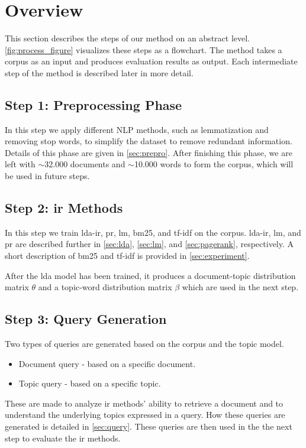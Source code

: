 \section{Overview}\label{sec:method}
This section describes the steps of our method on an abstract level.
\autoref{fig:process_figure} visualizes these steps as a flowchart.
The method takes a corpus as an input and produces evaluation results as output.
Each intermediate step of the method is described later in more detail.

\subsection*{Step 1: Preprocessing Phase}
In this step we apply different \gls{NLP} methods, such as lemmatization and removing stop words, to simplify the dataset to remove redundant information.
Details of this phase are given in \autoref{sec:prepro}.
After finishing this phase, we are left with $\sim$32.000 documents and $\sim$10.000 words to form the corpus, which will be used in future steps.

\subsection*{Step 2: \Gls{ir} Methods}
In this step we train \gls{lda}-\gls{ir}, \gls{pr}, \gls{lm}, \gls{bm25}, and \gls{tf-idf} on the corpus.
\gls{lda}-\gls{ir}, \gls{lm}, and \gls{pr} are described further in \autoref{sec:lda}, \autoref{sec:lm}, and \autoref{sec:pagerank}, respectively.
A short description of \gls{bm25} and \gls{tf-idf} is provided in \autoref{sec:experiment}.

After the \gls{lda} model has been trained, it produces a document-topic distribution matrix $\theta$ and a topic-word distribution matrix $\beta$ which are used in the next step.

\subsection*{Step 3: Query Generation}
Two types of queries are generated based on the corpus and the topic model.
\begin{itemize}
	\item Document query - based on a specific document.
	\item Topic query - based on a specific topic.
\end{itemize}
These are made to analyze \gls{ir} methods' ability to retrieve a document and to understand the underlying topics expressed in a query.
How these queries are generated is detailed in \autoref{sec:query}.
These queries are then used in the the next step to evaluate the \gls{ir} methods.

